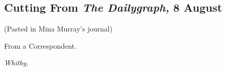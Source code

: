 \chapter[Chapter \thechapter]{}

\section{Cutting From \textit{The Dailygraph,} 8 August}
\begin{center}(Pasted in Mina Murray's journal)\end{center}


\begin{newspaper}{}{From a Correspondent.}

\begin{flushright}\itshape Whitby.\end{flushright}


\end{newspaper}
